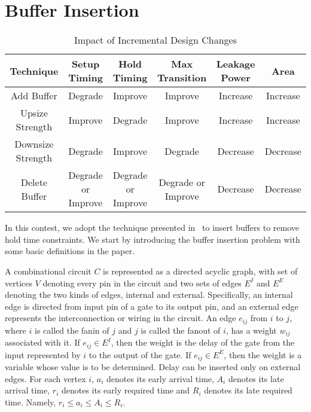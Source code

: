 \section{Buffer Insertion}

\begin{table*}
\caption{Impact of Incremental Design Changes}
\label{table:Change}
\centering
\begin{tabular}{|c|c|c|c|c|c|} \hline
Technique & Setup Timing & Hold Timing & Max Transition & Leakage Power & Area \\ \hline
Add Buffer & Degrade & Improve & Improve & Increase & Increase\\ \hline
Upsize Strength & Improve & Degrade & Improve & Increase & Increase \\ \hline
Downsize Strength & Degrade & Improve & Degrade & Decrease & Decrease \\ \hline
Delete Buffer & Degrade or Improve & Degrade or Improve & Degrade or Improve & Decrease & Decrease \\ \hline
\end{tabular}
\vspace{-1em}
\end{table*}

In this contest, we adopt the technique presented in~\cite{Shenoy:Minimum} to insert buffers to remove hold time constraints. We start by introducing the buffer insertion problem with some basic definitions in the paper.

A combinational circuit $C$ is represented as a directed acyclic graph, with set of vertices $V$ denoting every pin in the circuit and two sets of edges $E^{I}$ and $E^{E}$ denoting the two kinds of edges, internal and external. Specifically, an internal edge is directed from input pin of a gate to its output pin, and an external edge represents the interconnection or wiring in the circuit. An edge $e_{ij}$ from $i$ to $j$, where $i$ is called the fanin of $j$ and $j$ is called the fanout of $i$, has a weight $w_{ij}$ associated with it. If $e_{ij} \in E^{I}$, then the weight is the delay of the gate from the input represented by $i$ to the output of the gate. If $e_{ij} \in E^{E}$, then the weight is a variable whose value is to be determined. Delay can be inserted only on external edges. For each vertex $i$, $a_i$ denotes its early arrival time, $A_i$ denotes its late arrival time, $r_i$ denotes its early required time and $R_i$ denotes its late required time. Namely, $r_i \leq a_i \leq A_i \leq R_i$.

